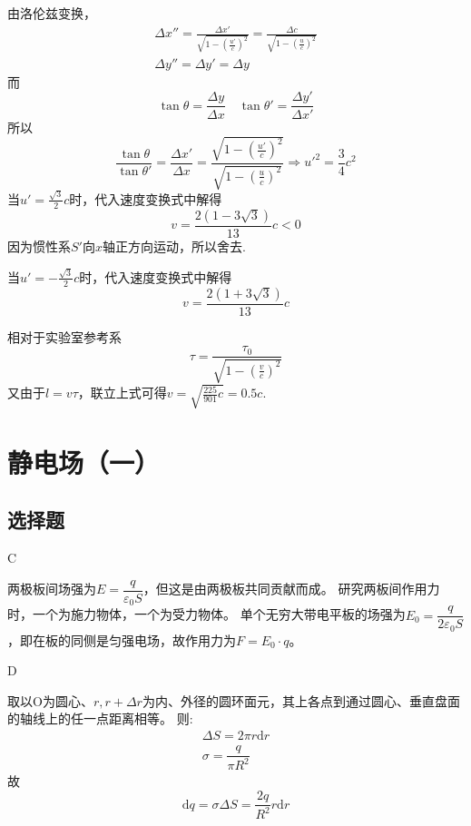 \documentclass[b5paper,opensource,sourcefont,parskip]{qyxf-book}
\newcommand{\di}[1]{\mathrm{d}#1}
\begin{document}
由洛伦兹变换，
\begin{align*}
\Delta x''=\frac{\Delta x'}{\sqrt{1-(\frac{u'}{c})^2}}=\frac{\Delta c}{\sqrt{1-(\frac{u}{c})^2}}\\\Delta y''=\Delta y'=\Delta y
\end{align*}
而
\begin{equation*}
\tan{\theta}=\frac{\Delta y}{\Delta x}\quad \tan{\theta'}=\frac{\Delta y'}{\Delta x'}
\end{equation*}
所以
\begin{equation*}
\frac{\tan{\theta}}{\tan{\theta'}}=\frac{\Delta x'}{\Delta x}=\frac{\sqrt{1-(\frac{u'}{c})^2}}{\sqrt{1-(\frac{u}{c})^2}}\Rightarrow u'^2=\frac{3}{4}c^2
\end{equation*}
当$u'=\frac{\sqrt{3}}{2}c$时，代入速度变换式中解得
\begin{equation*}
v=\frac{2(1-3\sqrt{3})}{13}c<0
\end{equation*}
因为惯性系$S'$向$x$轴正方向运动，所以舍去.

当$u'=-\frac{\sqrt{3}}{2}c$时，代入速度变换式中解得
\begin{equation*}
v=\frac{2(1+3\sqrt{3})}{13}c
\end{equation*}


\solve
相对于实验室参考系
\begin{equation*}
\tau=\frac{\tau_0}{\sqrt{1-(\frac{v}{c})^2}}
\end{equation*}
又由于$l=v\tau$，联立上式可得$v=\sqrt{\frac{225}{901}c}=0.5c$.

\chapter{静电场（一）}
\section{选择题}

C

\solve
两极板间场强为$E=\dfrac{q}{\varepsilon_0S}$，但这是由两极板共同贡献而成。
研究两板间作用力时，一个为施力物体，一个为受力物体。
单个无穷大带电平板的场强为$E_0=\dfrac{q}{2\varepsilon_0S}$，即在板的同侧是匀强电场，故作用力为$F=E_0\cdot q$。

D

\solve
取以O为圆心、$r,r+\Delta r$为内、外径的圆环面元，其上各点到通过圆心、垂直盘面的轴线上的任一点距离相等。
则:
\begin{gather*}
	\Delta S=2\pi r\di{r}\\
	\sigma=\dfrac{q}{\pi R^2}
\end{gather*}
故
\begin{equation*}
	\di{q}=\sigma \Delta S=\dfrac{2q}{R^2}r\di{r}
\end{equation*}
\end{document}
